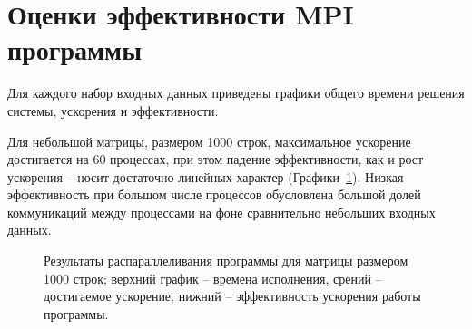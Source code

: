\documentclass[12pt, oneside, a4paper]{article}
\begin{document}
\section{Оценки эффективности MPI программы}

Для каждого набор входных данных приведены графики общего времени решения системы, ускорения и эффективности.

Для небольшой матрицы, размером 1000 строк, максимальное ускорение достигается на 60 процессах, при этом падение эффективности, как и рост ускорения -- носит достаточно линейных характер (Графики~\ref{fig:m1000}). Низкая эффективность при большом числе процессов обусловлена большой долей коммуникаций между процессами на фоне сравнительно небольших входных данных.

\begin{figure}[h!]
\caption{Результаты распараллеливания программы для матрицы размером 1000 строк; верхний график -- времена исполнения, срений -- достигаемое ускорение, нижний -- эффективность ускорения работы программы.}
\label{fig:m1000}
\end{figure}
\end{document}
